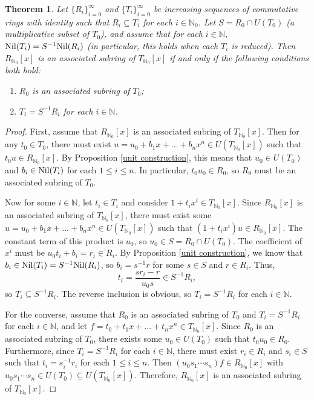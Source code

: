 \documentclass[12pt]{amsart}
\newtheorem{theorem}{Theorem}[section]
\theoremstyle{definition}
\newcommand{\bN}{\mathbb N}
\newcommand{\bNo}{{{\mathbb N}_0}}
\newcommand{\Nil}{\textup{Nil}}
\begin{document}
\begin{theorem}
    \label{associated polynomials}
    Let $\{R_i\}_{i=0}^\infty$ and $\{T_i\}_{i=0}^\infty$ be increasing sequences of commutative rings with identity such that $R_i\subseteq T_i$ for each $i\in\bN_0$. Let $S=R_0\cap U(T_0)$ (a multiplicative subset of $T_0$), and assume that for each $i\in\bN$, $\Nil(T_i)=S^{-1}\Nil(R_i)$ (in particular, this holds when each $T_i$ is reduced). Then $R_{\bNo}[x]$ is an associated subring of $T_{\bNo}[x]$ if and only if the following conditions both hold:
    \begin{enumerate}
        \item $R_0$ is an associated subring of $T_0$;
        \item $T_i=S^{-1}R_i$ for each $i\in\bN$.
    \end{enumerate}
\end{theorem}

\begin{proof}
    First, assume that $R_\bNo[x]$ is an associated subring of $T_\bNo[x]$. Then for any $t_0\in T_0$, there must exist $u=u_0+b_1x+\dots+b_nx^n\in U(T_\bNo[x])$ such that $t_0u\in R_{\bNo}[x]$. By Proposition \ref{unit construction}, this means that $u_0\in U(T_0)$ and $b_i\in \Nil(T_i)$ for each $1\leq i\leq n$. In particular, $t_0u_0\in R_0$, so $R_0$ must be an associated subring of $T_0$.

    Now for some $i\in\bN$, let $t_i\in T_i$ and consider $1+t_ix^i\in T_\bNo[x]$. Since $R_\bNo[x]$ is an associated subring of $T_\bNo[x]$, there must exist some $u=u_0+b_1x+\dots+b_nx^n\in U(T_\bNo[x])$ such that $(1+t_ix^i)u\in R_{\bNo}[x]$. The constant term of this product is $u_0$, so $u_0\in S=R_0\cap U(T_0)$. The coefficient of $x^i$ must be $u_0t_i+b_i=r_i\in R_i$. By Proposition \ref{unit construction}, we know that $b_i\in \Nil(T_i)=S^{-1}\Nil(R_i)$, so $b_i=s^{-1}r$ for some $s\in S$ and $r\in R_i$. Thus,
    $$t_i=\frac{sr_i-r}{u_0s}\in S^{-1}R_i,$$
    so $T_i\subseteq S^{-1}R_i$. The reverse inclusion is obvious, so $T_i=S^{-1}R_i$ for each $i\in\bN$.

    For the converse, assume that $R_0$ is an associated subring of $T_0$ and $T_i=S^{-1}R_i$ for each $i\in\bN$, and let $f=t_0+t_1x+\dots+t_nx^n\in T_\bNo[x]$. Since $R_0$ is an associated subring of $T_0$, there exists some $u_0\in U(T_0)$ such that $t_0u_0\in R_0$. Furthermore, since $T_i=S^{-1}R_i$ for each $i\in\bN$, there must exist $r_i\in R_i$ and $s_i\in S$ such that $t_i=s_i^{-1}r_i$ for each $1\leq i\leq n$. Then $(u_0s_1\cdots s_n)f\in R_\bNo[x]$ with $u_0s_1\cdots s_n\in U(T_0)\subseteq U(T_\bNo[x])$. Therefore, $R_\bNo[x]$ is an associated subring of $T_\bNo[x]$.
\end{proof}
\end{document}

